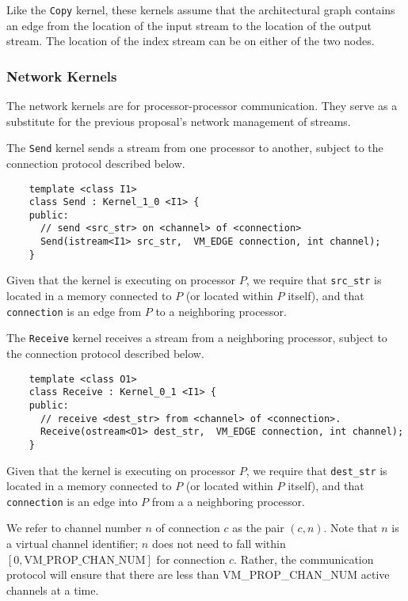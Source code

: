 Like the {\tt Copy} kernel, these kernels assume that the
architectural graph contains an edge from the location of the input
stream to the location of the output stream.  The location of the
index stream can be on either of the two nodes.

\subsubsection*{Network Kernels}

The network kernels are for processor-processor communication.  They
serve as a substitute for the previous proposal's network management
of streams.

 The {\tt Send} kernel sends a stream from one processor to
another, subject to the connection protocol described below.
{\small
\begin{verbatim}
    template <class I1>
    class Send : Kernel_1_0 <I1> {
    public:
      // send <src_str> on <channel> of <connection>
      Send(istream<I1> src_str,  VM_EDGE connection, int channel);
    }
\end{verbatim}}

Given that the kernel is executing on processor $P$, we require that
{\tt src\_str} is located in a memory connected to $P$ (or located
within $P$ itself), and that {\tt connection} is an edge from $P$ to a
neighboring processor.

 The {\tt Receive} kernel receives a stream from a
neighboring processor, subject to the connection protocol described
below.  
{\small
\begin{verbatim}
    template <class O1>
    class Receive : Kernel_0_1 <I1> {
    public:
      // receive <dest_str> from <channel> of <connection>.
      Receive(ostream<O1> dest_str,  VM_EDGE connection, int channel);
    }  
\end{verbatim}}

Given that the kernel is executing on processor $P$, we require that
{\tt dest\_str} is located in a memory connected to $P$ (or located
within $P$ itself), and that {\tt connection} is an edge into $P$ from
a a neighboring processor.

 We refer to channel number $n$ of
connection $c$ as the pair $(c, n)$.  Note that $n$ is a virtual
channel identifier; $n$ does not need to fall within $[0,
\mbox{VM\_PROP\_CHAN\_NUM}]$ for connection $c$.  Rather, the
communication protocol will ensure that there are less than
VM\_PROP\_CHAN\_NUM active channels at a time.

